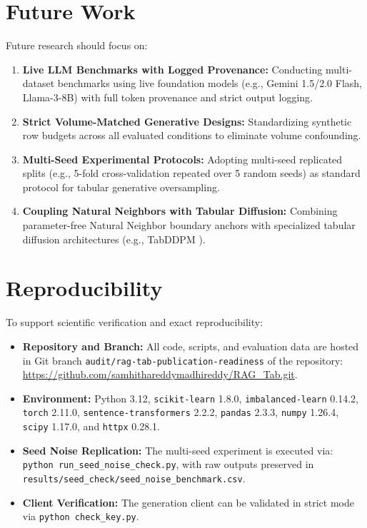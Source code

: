 \documentclass[sn-basic]{sn-jnl}
\begin{document}
\section{Future Work}
\label{sec:future_work}

Future research should focus on:
\begin{enumerate}
    \item \textbf{Live LLM Benchmarks with Logged Provenance:} Conducting multi-dataset benchmarks using live foundation models (e.g., Gemini 1.5/2.0 Flash, Llama-3-8B) with full token provenance and strict output logging.
    \item \textbf{Strict Volume-Matched Generative Designs:} Standardizing synthetic row budgets across all evaluated conditions to eliminate volume confounding.
    \item \textbf{Multi-Seed Experimental Protocols:} Adopting multi-seed replicated splits (e.g., 5-fold cross-validation repeated over 5 random seeds) as standard protocol for tabular generative oversampling.
    \item \textbf{Coupling Natural Neighbors with Tabular Diffusion:} Combining parameter-free Natural Neighbor boundary anchors with specialized tabular diffusion architectures (e.g., TabDDPM \citep{kotelnikov2023tabddpm}).
\end{enumerate}

\section{Reproducibility}
\label{sec:reproducibility}

To support scientific verification and exact reproducibility:
\begin{itemize}
    \item \textbf{Repository and Branch:} All code, scripts, and evaluation data are hosted in Git branch \texttt{audit/rag-tab-publication-readiness} of the repository:
    \url{https://github.com/samhithareddymadhireddy/RAG_Tab.git}.
    \item \textbf{Environment:} Python 3.12, \texttt{scikit-learn} 1.8.0, \texttt{imbalanced-learn} 0.14.2, \texttt{torch} 2.11.0, \texttt{sentence-transformers} 2.2.2, \texttt{pandas} 2.3.3, \texttt{numpy} 1.26.4, \texttt{scipy} 1.17.0, and \texttt{httpx} 0.28.1.
    \item \textbf{Seed Noise Replication:} The multi-seed experiment is executed via:
    \texttt{python run\_seed\_noise\_check.py}, with raw outputs preserved in \texttt{results/seed\_check/seed\_noise\_benchmark.csv}.
    \item \textbf{Client Verification:} The generation client can be validated in strict mode via \texttt{python check\_key.py}.
\end{itemize}
\end{document}
